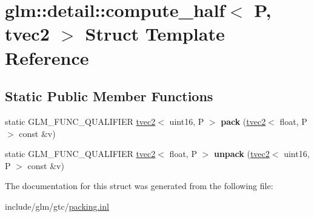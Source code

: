 \hypertarget{structglm_1_1detail_1_1compute__half_3_01P_00_01tvec2_01_4}{}\section{glm\+:\+:detail\+:\+:compute\+\_\+half$<$ P, tvec2 $>$ Struct Template Reference}
\label{structglm_1_1detail_1_1compute__half_3_01P_00_01tvec2_01_4}
\subsection*{Static Public Member Functions}
\begin{DoxyCompactItemize}
\item 
\mbox{\label{structglm_1_1detail_1_1compute__half_3_01P_00_01tvec2_01_4_ad4f9aae8c371dfc6bb0c566beac0d172}} 
static G\+L\+M\+\_\+\+F\+U\+N\+C\+\_\+\+Q\+U\+A\+L\+I\+F\+I\+ER \hyperlink{structglm_1_1tvec2}{tvec2}$<$ uint16, P $>$ {\bfseries pack} (\hyperlink{structglm_1_1tvec2}{tvec2}$<$ float, P $>$ const \&v)
\item 
\mbox{\label{structglm_1_1detail_1_1compute__half_3_01P_00_01tvec2_01_4_a6458eaa1f6f937b70380469ad6c17f5e}} 
static G\+L\+M\+\_\+\+F\+U\+N\+C\+\_\+\+Q\+U\+A\+L\+I\+F\+I\+ER \hyperlink{structglm_1_1tvec2}{tvec2}$<$ float, P $>$ {\bfseries unpack} (\hyperlink{structglm_1_1tvec2}{tvec2}$<$ uint16, P $>$ const \&v)
\end{DoxyCompactItemize}


The documentation for this struct was generated from the following file\+:\begin{DoxyCompactItemize}
\item 
include/glm/gtc/\hyperlink{packing_8inl}{packing.\+inl}\end{DoxyCompactItemize}

